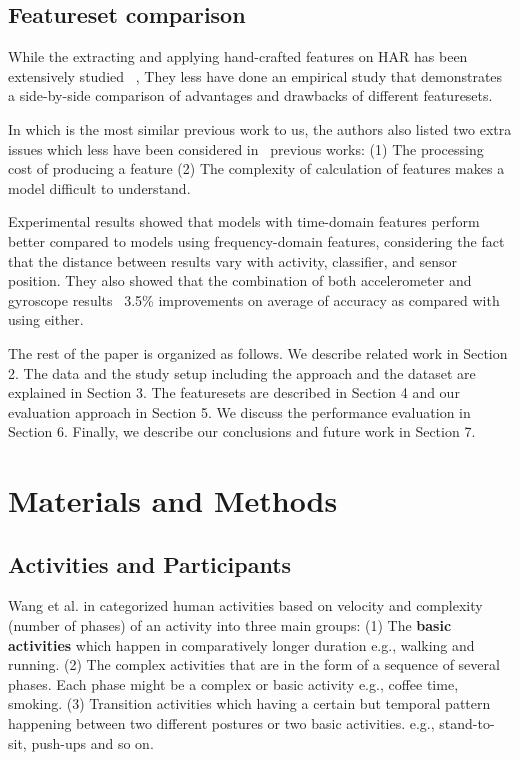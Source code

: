 \documentclass[journal,article,submit,moreauthors,pdftex]{Definitions/mdpi}
\begin{document}
\subsection{Featureset comparison}

While the extracting and applying hand-crafted features on HAR has been extensively studied ~\cite{wang2019survey,janidarmian2017comprehensive}, They less have done an empirical study that demonstrates a side-by-side comparison of advantages and drawbacks of different featuresets.

In \cite{rosati2018comparison} which is the most similar previous work to us, the authors also listed two extra issues which less have been considered in \
previous works:
(1) The processing cost of producing a feature
(2) The complexity of calculation of features makes a model difficult to understand.


\cite{s140610146}Experimental results showed that models with time-domain features perform better compared to models using frequency-domain features, considering the fact that the distance between results vary with activity, classifier, and sensor position. They also showed that the combination of both accelerometer and gyroscope results ~3.5\% improvements on average of accuracy as compared with using either.


The rest of the paper is organized as follows. We describe related work in Section 2. The data and the study setup including the approach and the dataset are explained in Section 3. The featuresets are described in Section 4 and our evaluation approach in Section 5. We discuss the performance evaluation in Section 6. Finally, we describe our conclusions and future work in Section 7.


\section{Materials and Methods}

\subsection{Activities and Participants}

Wang et al. in \cite{wang2019survey} categorized human activities based on velocity and complexity (number of phases) of an activity into three main groups: (1) The \textbf{basic activities} which happen in comparatively longer duration e.g., walking and running. (2)  The complex activities that are in the form of a sequence of several phases. Each phase might be a complex or basic activity e.g., coffee time, smoking. (3) Transition activities which having a certain but temporal pattern happening between two different postures or two basic activities. e.g., stand-to-sit, push-ups and so on. 
\end{document}
